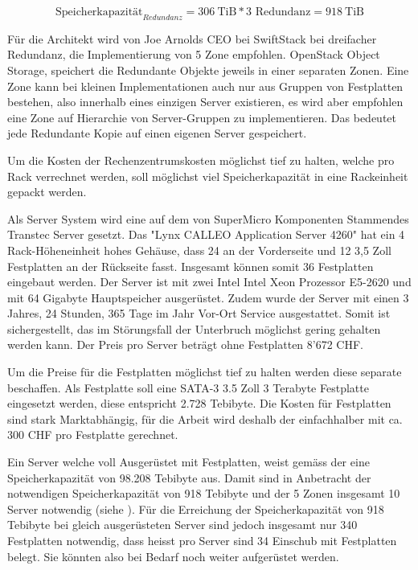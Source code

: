 \begin{equation}
\mbox{Speicherkapazität}_{Redundanz} = 306  \mathrm{\ TiB} * 3 \mbox{\ Redundanz} =  918 \mathrm{\ TiB}
\label{eqn:SpeicherkapazitätS2}
\end{equation}

Für die Architekt wird von Joe Arnolds CEO bei SwiftStack bei dreifacher Redundanz, die Implementierung von 5 Zone empfohlen. OpenStack Object Storage, speichert die Redundante Objekte jeweils in einer separaten Zonen. Eine Zone kann bei kleinen Implementationen auch nur aus Gruppen von Festplatten bestehen, also innerhalb eines einzigen Server existieren, es wird aber empfohlen eine Zone auf Hierarchie von Server-Gruppen zu implementieren. Das bedeutet jede Redundante Kopie auf einen eigenen Server gespeichert. \cite{Arnold} 

Um die Kosten der Rechenzentrumskosten möglichst tief zu halten, welche pro Rack verrechnet werden, soll möglichst viel Speicherkapazität in eine Rackeinheit gepackt werden.

Als Server System wird eine auf dem von SuperMicro Komponenten Stammendes Transtec Server gesetzt. Das "Lynx CALLEO Application Server 4260" hat ein 4 Rack-Höheneinheit hohes Gehäuse, dass 24 an der Vorderseite und 12 3,5 Zoll Festplatten an der Rückseite fasst. Insgesamt können somit 36 Festplatten eingebaut werden. Der Server ist mit zwei Intel Intel Xeon Prozessor E5-2620 und mit 64 Gigabyte Hauptspeicher ausgerüstet. Zudem wurde der Server mit einen 3 Jahres, 24 Stunden, 365 Tage im Jahr Vor-Ort Service ausgestattet. Somit ist sichergestellt, das im Störungsfall der Unterbruch möglichst gering gehalten werden kann. Der Preis pro Server beträgt ohne Festplatten 8'672 CHF.

Um die Preise für die Festplatten möglichst tief zu halten werden diese separate beschaffen. Als Festplatte soll eine SATA-3 3.5 Zoll 3 Terabyte Festplatte eingesetzt werden, diese entspricht 2.728 Tebibyte. Die Kosten für Festplatten sind stark Marktabhängig, für die Arbeit wird deshalb der einfachhalber mit ca. 300 CHF pro Festplatte gerechnet.

Ein Server welche voll Ausgerüstet mit Festplatten, weist gemäss der   eine Speicherkapazität von 98.208 Tebibyte aus. Damit sind in Anbetracht der notwendigen Speicherkapazität von 918 Tebibyte und der 5 Zonen insgesamt 10 Server notwendig (siehe ). Für die Erreichung der Speicherkapazität von 918 Tebibyte bei gleich ausgerüsteten Server sind jedoch insgesamt nur 340 Festplatten notwendig, dass heisst pro Server sind 34 Einschub mit Festplatten belegt. Sie könnten also bei Bedarf noch weiter aufgerüstet werden.

